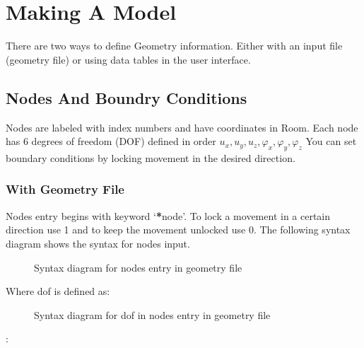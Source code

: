 \documentclass[letterpaper,10pt,english]{sphinxmanual}
\begin{document}
\section{Making A Model}
\label{\detokenize{making_a_model:making-a-model}}\label{\detokenize{making_a_model::doc}}
There are two ways to define Geometry information. Either with an input file (geometry file) or using data
tables in the user interface.


\subsection{Nodes And Boundry Conditions}
\label{\detokenize{making_a_model:nodes-and-boundry-conditions}}\label{\detokenize{making_a_model:nodes-input}}
Nodes are labeled with index numbers and have coordinates in Room.
Each node has 6 degrees of freedom (DOF) defined in order \(u_x, u_y, u_z, \varphi_x, \varphi_y, \varphi_z\)
You can set boundary conditions by locking movement in the desired direction.


\subsubsection{With Geometry File}
\label{\detokenize{making_a_model:with-geometry-file}}
Nodes entry begins with keyword ‘{\color{red}\bfseries{}*}node’.
To lock a movement in a certain direction use 1 and to keep the movement unlocked use 0.
The following syntax diagram shows the syntax for nodes input.

\begin{figure}[htbp]
\centering
\capstart

\noindent{}
\caption{Syntax diagram for nodes entry in geometry file}\label{\detokenize{making_a_model:id21}}\end{figure}

Where dof is defined as:

\begin{figure}[htbp]
\centering
\capstart

\noindent{}
\caption{Syntax diagram for dof in nodes entry in geometry file}\label{\detokenize{making_a_model:id22}}\end{figure}

:
\end{document}
